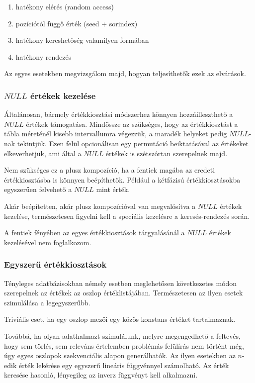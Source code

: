 \documentclass[
    parspace,
    noindent,
    nohyp,
]{elteiktdk}[2023/04/10]
\begin{document}
\begin{enumerate}
  \item hatékony elérés (random access)
  \item pozíciótól függő érték (seed + sorindex)
  \item hatékony kereshetőség valamilyen formában
  \item hatékony rendezés
\end{enumerate}

Az egyes esetekben megvizsgálom majd, hogyan teljesíthetők ezek az elvárások.

\subsubsection{$NULL$ értékek kezelése}

Általánosan, bármely értékkiosztási módszerhez könnyen hozzáilleszthető a $NULL$ értékek támogatása.
Mindössze az szükséges, hogy az értékkiosztást a tábla méreténél kisebb intervallumra végezzük,
a maradék helyeket pedig $NULL$-nak tekintjük.
Ezen felül opcionálisan egy permutáció beiktatásával az értékeket elkeverhetjük,
ami által a $NULL$ értékek is szétszórtan szerepelnek majd.

Nem szükséges ez a plusz kompozíció,
ha a fentiek magába az eredeti értékkiosztásba is könnyen beépíthetők.
Például a kétfázisú értékkiosztásokba egyszerűen felvehető a $NULL$ mint érték.

Akár beépítetten, akár plusz kompozícióval van megvalósítva a $NULL$ értékek kezelése,
természetesen figyelni kell a speciális kezelésre a keresés-rendezés során.

A fentiek fényében az egyes értékkiosztások tárgyalásánál a $NULL$ értékek kezelésével nem foglalkozom.

\subsubsection{Egyszerű értékkiosztások}

Tényleges adatbázisokban némely esetben meglehetősen következetes módon
szerepelnek az értékek az oszlop értéklistájában.
Természetesen az ilyen esetek szimulálása a legegyszerűbb.

Triviális eset, ha egy oszlop mezői egy közös konstans értéket tartalmaznak.

Továbbá, ha olyan adathalmazt szimulálunk, melyre megengedhető a feltevés,
hogy sem törlés, sem releváns értelemben problémás felülírás nem történt még,
úgy egyes oszlopok szekvenciális alapon generálhatók.
Az ilyen esetekben az $n$-edik érték lekérése
egy egyszerű lineáris függvénnyel számolható.
Az érték keresése hasonló, lényegileg az inverz függvényt kell alkalmazni.
\end{document}
